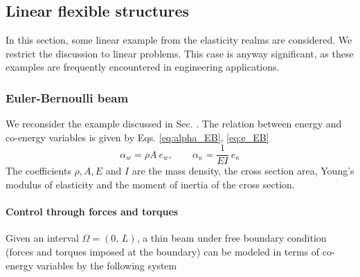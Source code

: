 \subsection{Linear flexible structures}

In this section, some linear example from the elasticity realms are considered. We restrict the discussion to linear problems. This case is anyway significant, as these examples are frequently encountered in engineering applications. 


\subsubsection{Euler-Bernoulli beam}
We reconsider the example discussed in Sec. . The relation between energy and co-energy variables is given by Eqs. \eqref{eq:alpha_EB}, \eqref{eq:e_EB}
\begin{equation}
\alpha_w = \rho A \ e_w, \qquad \alpha_\kappa = \frac{1}{EI}\ e_\kappa
\end{equation}
The coefficients $\rho, A, E$ and $I$  are the mass density, the cross section area, Young's modulus of elasticity and the moment of inertia of the cross section. 

\paragraph{Control through forces and torques} Given an interval $\Omega = (0, \, L)$, a thin beam under free boundary condition (forces and torques imposed at the boundary) can be modeled in terms of co-energy variables by the following system

